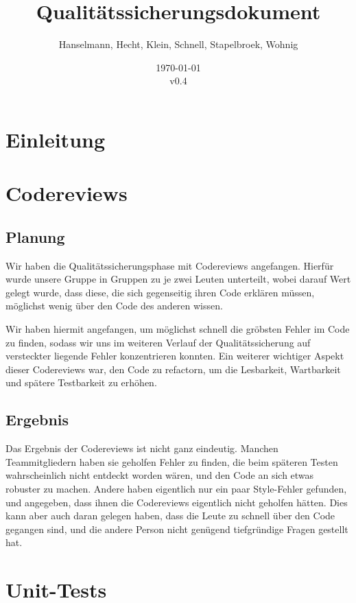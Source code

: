 \documentclass[a4paper]{scrreprt}
\begin{document}
\title{Qualitätssicherungsdokument}
\author{Hanselmann, Hecht, Klein, Schnell, Stapelbroek, Wohnig}
\date{\today\\v0.4}
\maketitle 
\tableofcontents	

\chapter{Einleitung}


\chapter{Codereviews}

\section{Planung}
Wir haben die Qualitätssicherungsphase mit Codereviews angefangen.
Hierfür wurde unsere Gruppe in Gruppen zu je zwei Leuten unterteilt, wobei
darauf Wert gelegt wurde, dass diese, die sich gegenseitig ihren Code erklären
müssen, möglichst wenig über den Code des anderen wissen. 

Wir haben hiermit
angefangen, um möglichst schnell die gröbsten Fehler im Code zu finden, sodass
wir uns im weiteren Verlauf der Qualitätssicherung auf versteckter liegende Fehler konzentrieren
konnten. Ein weiterer wichtiger Aspekt dieser Codereviews war, den Code zu
refactorn, um die Lesbarkeit, Wartbarkeit und spätere Testbarkeit zu erhöhen.

\section{Ergebnis}
Das Ergebnis der Codereviews ist nicht ganz eindeutig. Manchen
Teammitgliedern haben sie geholfen Fehler zu finden, die beim späteren Testen
wahrscheinlich nicht entdeckt worden wären, und den Code an sich etwas robuster
zu machen. Andere haben eigentlich nur ein paar Style-Fehler gefunden, und
angegeben, dass ihnen die Codereviews eigentlich nicht geholfen hätten. Dies
kann aber auch daran gelegen haben, dass die Leute zu schnell über den Code
gegangen sind, und die andere Person nicht genügend tiefgründige Fragen
gestellt hat.

\chapter{Unit-Tests}
\end{document}
